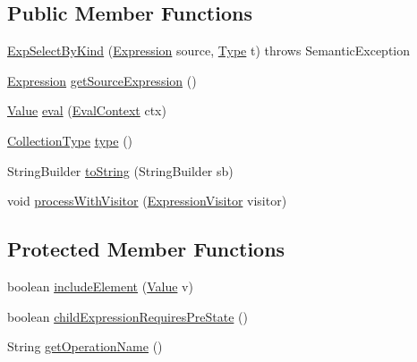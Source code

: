 \subsection*{Public Member Functions}
\begin{DoxyCompactItemize}
\item 
\hyperlink{classorg_1_1tzi_1_1use_1_1uml_1_1ocl_1_1expr_1_1_exp_select_by_kind_a2486eb709de898aba1788cb4420d53a9}{Exp\-Select\-By\-Kind} (\hyperlink{classorg_1_1tzi_1_1use_1_1uml_1_1ocl_1_1expr_1_1_expression}{Expression} source, \hyperlink{interfaceorg_1_1tzi_1_1use_1_1uml_1_1ocl_1_1type_1_1_type}{Type} t)  throws Semantic\-Exception 
\item 
\hyperlink{classorg_1_1tzi_1_1use_1_1uml_1_1ocl_1_1expr_1_1_expression}{Expression} \hyperlink{classorg_1_1tzi_1_1use_1_1uml_1_1ocl_1_1expr_1_1_exp_select_by_kind_a7701fa3bda61baeeb8edd38665a250f3}{get\-Source\-Expression} ()
\item 
\hyperlink{classorg_1_1tzi_1_1use_1_1uml_1_1ocl_1_1value_1_1_value}{Value} \hyperlink{classorg_1_1tzi_1_1use_1_1uml_1_1ocl_1_1expr_1_1_exp_select_by_kind_a8d2c467f83010fbfadc82f18ca6e62db}{eval} (\hyperlink{classorg_1_1tzi_1_1use_1_1uml_1_1ocl_1_1expr_1_1_eval_context}{Eval\-Context} ctx)
\item 
\hyperlink{classorg_1_1tzi_1_1use_1_1uml_1_1ocl_1_1type_1_1_collection_type}{Collection\-Type} \hyperlink{classorg_1_1tzi_1_1use_1_1uml_1_1ocl_1_1expr_1_1_exp_select_by_kind_a8032971bf1168ebd8a2fb8376f3824f0}{type} ()
\item 
String\-Builder \hyperlink{classorg_1_1tzi_1_1use_1_1uml_1_1ocl_1_1expr_1_1_exp_select_by_kind_a1edd4c9230dc0c14dd0d30853ac5cfcf}{to\-String} (String\-Builder sb)
\item 
void \hyperlink{classorg_1_1tzi_1_1use_1_1uml_1_1ocl_1_1expr_1_1_exp_select_by_kind_a52cf6df35c4220338641cdece8ea9e33}{process\-With\-Visitor} (\hyperlink{interfaceorg_1_1tzi_1_1use_1_1uml_1_1ocl_1_1expr_1_1_expression_visitor}{Expression\-Visitor} visitor)
\end{DoxyCompactItemize}
\subsection*{Protected Member Functions}
\begin{DoxyCompactItemize}
\item 
boolean \hyperlink{classorg_1_1tzi_1_1use_1_1uml_1_1ocl_1_1expr_1_1_exp_select_by_kind_a31f0cc5213567ac372e595994b031762}{include\-Element} (\hyperlink{classorg_1_1tzi_1_1use_1_1uml_1_1ocl_1_1value_1_1_value}{Value} v)
\item 
boolean \hyperlink{classorg_1_1tzi_1_1use_1_1uml_1_1ocl_1_1expr_1_1_exp_select_by_kind_a215070e2fb0415e359d94ace0a71d51a}{child\-Expression\-Requires\-Pre\-State} ()
\item 
String \hyperlink{classorg_1_1tzi_1_1use_1_1uml_1_1ocl_1_1expr_1_1_exp_select_by_kind_a5c96439219a38372202bebe258454219}{get\-Operation\-Name} ()
\end{DoxyCompactItemize}


